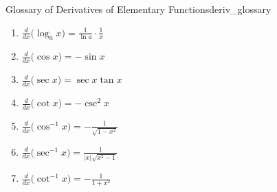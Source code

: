 \begin{theorem}{Glossary of Derivatives of Elementary Functions}{deriv_glossary}
\begin{minipage}{.5\textwidth}
\begin{enumerate}
	\item		$\frac{d}{dx}\big(\log_a x\big) = \frac{1}{\ln a}\cdot\frac{1}{x}$\addtocounter{enumi}{1}
	\item		$\frac{d}{dx}\big(\cos x\big) = -\sin x$\addtocounter{enumi}{1}
	\item		$\frac{d}{dx}\big(\sec x\big) = \sec x\tan x$\addtocounter{enumi}{1}
	\item		$\frac{d}{dx}\big(\cot x\big) = -\csc^2x$\addtocounter{enumi}{1}
	\item		$\frac{d}{dx}\big(\cos^{-1}x\big) = -\frac{1}{\sqrt{1-x^2}}$\addtocounter{enumi}{1}
	\item		$\frac{d}{dx}\big(\sec^{-1}x\big) = \frac{1}{|x|\sqrt{x^2-1}}$\addtocounter{enumi}{1}
	\item		$\frac{d}{dx}\big(\cot^{-1}x\big) = -\frac{1}{1+x^2}$
	\end{enumerate}
\normalsize
\end{minipage}

\end{theorem}
